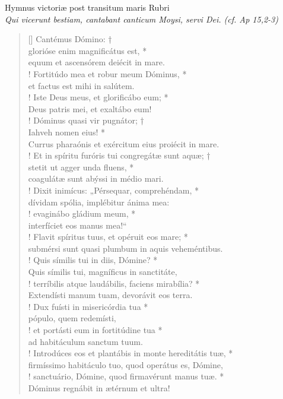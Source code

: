 \begin{center}
 


Hymnus victoriæ post transitum maris Rubri\\
\textit{\small Qui vicerunt bestiam, cantabant canticum Moysi, servi Dei. (cf. Ap 15,2-3)}
\end{center}
\begin{verse}[\versewidth]
Cantémus Dómino: †\\
glorióse enim magnificátus est, *\\
equum et ascensórem deiécit in mare.\\!
\vin Fortitúdo mea et robur meum Dóminus, *\\
\vin et factus est mihi in salútem.\\!
Iste Deus meus, et glorificábo eum; *\\
Deus patris mei, et exaltábo eum!\\!
\vin Dóminus quasi vir pugnátor; †\\
\vin Iahveh nomen eius! *\\
\vin Currus pharaónis et exércitum eius proiécit in mare.\\!
Et in spíritu furóris tui congregátæ sunt aquæ; †\\
stetit ut agger unda fluens, *\\
coagulátæ sunt abýssi in médio mari.\\!
\vin Dixit inimícus: „Pérsequar, comprehéndam, *\\
\vin dívidam spólia, implébitur ánima mea:\\!
evaginábo gládium meum, *\\
interfíciet eos manus mea!“\\!
\vin Flavit spíritus tuus, et opéruit eos mare; *\\
\vin submérsi sunt quasi plumbum in aquis veheméntibus.\\!
Quis símilis tui in diis, Dómine? *\\
Quis símilis tui, magníficus in sanctitáte,\\!
\vin terríbilis atque laudábilis, faciens mirabília? *\\
\vin Extendísti manum tuam, devorávit eos terra.\\!
Dux fuísti in misericórdia tua *\\
pópulo, quem redemísti,\\!
\vin et portásti eum in fortitúdine tua *\\
\vin ad habitáculum sanctum tuum.\\!
Introdúces eos et plantábis in monte hereditátis tuæ, *\\
firmíssimo habitáculo tuo, quod operátus es, Dómine,\\!
\vin sanctuário, Dómine, quod firmavérunt manus tuæ. *\\
\vin Dóminus regnábit in ætérnum et ultra!\\
\end{verse}
\vspace{1cm}


